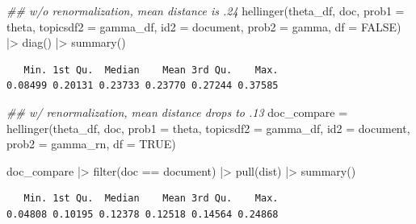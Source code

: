 \documentclass[
]{article}
\newenvironment{Shaded}{\begin{snugshade}}{\end{snugshade}}
\newcommand{\AttributeTok}[1]{\textcolor[rgb]{0.40,0.45,0.13}{#1}}
\newcommand{\ConstantTok}[1]{\textcolor[rgb]{0.56,0.35,0.01}{#1}}
\newcommand{\DocumentationTok}[1]{\textcolor[rgb]{0.37,0.37,0.37}{\textit{#1}}}
\newcommand{\FunctionTok}[1]{\textcolor[rgb]{0.28,0.35,0.67}{#1}}
\newcommand{\NormalTok}[1]{\textcolor[rgb]{0.00,0.23,0.31}{#1}}
\newcommand{\OtherTok}[1]{\textcolor[rgb]{0.00,0.23,0.31}{#1}}
\newcommand{\SpecialCharTok}[1]{\textcolor[rgb]{0.37,0.37,0.37}{#1}}
\begin{document}
\begin{Shaded}
\begin{Highlighting}[]
\DocumentationTok{\#\# w/o renormalization, mean distance is .24}
\FunctionTok{hellinger}\NormalTok{(theta\_df, doc, }\AttributeTok{prob1 =}\NormalTok{ theta,}
          \AttributeTok{topicsdf2 =}\NormalTok{ gamma\_df, }
          \AttributeTok{id2 =}\NormalTok{ document, }
          \AttributeTok{prob2 =}\NormalTok{ gamma, }\AttributeTok{df =} \ConstantTok{FALSE}\NormalTok{) }\SpecialCharTok{|\textgreater{}} 
    \FunctionTok{diag}\NormalTok{() }\SpecialCharTok{|\textgreater{}} 
    \FunctionTok{summary}\NormalTok{()}
\end{Highlighting}
\end{Shaded}

\begin{verbatim}
   Min. 1st Qu.  Median    Mean 3rd Qu.    Max. 
0.08499 0.20131 0.23733 0.23770 0.27244 0.37585 
\end{verbatim}

\begin{Shaded}
\begin{Highlighting}[]
\DocumentationTok{\#\# w/ renormalization, mean distance drops to .13}
\NormalTok{doc\_compare }\OtherTok{=} \FunctionTok{hellinger}\NormalTok{(theta\_df, doc, }\AttributeTok{prob1 =}\NormalTok{ theta,}
                        \AttributeTok{topicsdf2 =}\NormalTok{ gamma\_df, }
                        \AttributeTok{id2 =}\NormalTok{ document, }
                        \AttributeTok{prob2 =}\NormalTok{ gamma\_rn, }\AttributeTok{df =} \ConstantTok{TRUE}\NormalTok{)}

\NormalTok{doc\_compare }\SpecialCharTok{|\textgreater{}} 
    \FunctionTok{filter}\NormalTok{(doc }\SpecialCharTok{==}\NormalTok{ document) }\SpecialCharTok{|\textgreater{}} 
    \FunctionTok{pull}\NormalTok{(dist) }\SpecialCharTok{|\textgreater{}} 
    \FunctionTok{summary}\NormalTok{()}
\end{Highlighting}
\end{Shaded}

\begin{verbatim}
   Min. 1st Qu.  Median    Mean 3rd Qu.    Max. 
0.04808 0.10195 0.12378 0.12518 0.14564 0.24868 
\end{verbatim}
\end{document}
